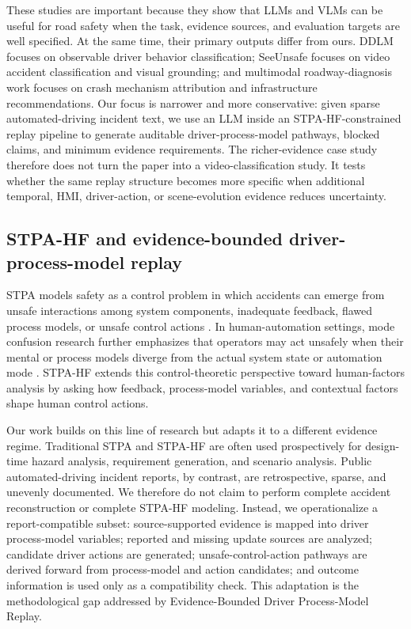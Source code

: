 These studies are important because they show that LLMs and VLMs can be useful for road safety when the task, evidence sources, and evaluation targets are well specified. At the same time, their primary outputs differ from ours. DDLM focuses on observable driver behavior classification; SeeUnsafe focuses on video accident classification and visual grounding; and multimodal roadway-diagnosis work focuses on crash mechanism attribution and infrastructure recommendations. Our focus is narrower and more conservative: given sparse automated-driving incident text, we use an LLM inside an STPA-HF-constrained replay pipeline to generate auditable driver-process-model pathways, blocked claims, and minimum evidence requirements. The richer-evidence case study therefore does not turn the paper into a video-classification study. It tests whether the same replay structure becomes more specific when additional temporal, HMI, driver-action, or scene-evolution evidence reduces uncertainty.

\subsection{STPA-HF and evidence-bounded driver-process-model replay}

STPA models safety as a control problem in which accidents can emerge from unsafe interactions among system components, inadequate feedback, flawed process models, or unsafe control actions \citep{leveson2011engineering,leveson2018handbook}. In human-automation settings, mode confusion research further emphasizes that operators may act unsafely when their mental or process models diverge from the actual system state or automation mode \citep{sarter1995mode,bishop2023modeconfusion}. STPA-HF extends this control-theoretic perspective toward human-factors analysis by asking how feedback, process-model variables, and contextual factors shape human control actions.

Our work builds on this line of research but adapts it to a different evidence regime. Traditional STPA and STPA-HF are often used prospectively for design-time hazard analysis, requirement generation, and scenario analysis. Public automated-driving incident reports, by contrast, are retrospective, sparse, and unevenly documented. We therefore do not claim to perform complete accident reconstruction or complete STPA-HF modeling. Instead, we operationalize a report-compatible subset: source-supported evidence is mapped into driver process-model variables; reported and missing update sources are analyzed; candidate driver actions are generated; unsafe-control-action pathways are derived forward from process-model and action candidates; and outcome information is used only as a compatibility check. This adaptation is the methodological gap addressed by Evidence-Bounded Driver Process-Model Replay.
